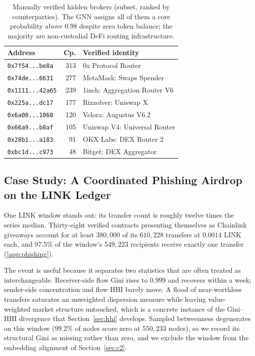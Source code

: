 \documentclass[final,5p,times]{elsarticle}
\begin{document}
\begin{table}[H]
\centering\small
\caption{Manually verified hidden brokers (subset, ranked by
counterparties). The GNN assigns all of them a core probability above
$0.98$ despite zero token balance; the majority are non-custodial DeFi
routing infrastructure.}
\label{tab:brokers}
\setlength{\tabcolsep}{4pt}
\begin{tabular}{@{}lrl@{}}
\toprule
Address & Cp. & Verified identity \\
\midrule
\texttt{0x7f54...be8a} & 313 & 0x Protocol Router \\
\texttt{0x74de...6631} & 277 & MetaMask: Swaps Spender \\
\texttt{0x1111...42a65} & 239 & 1inch: Aggregation Router V6 \\
\texttt{0x225a...dc17} & 177 & Rizzolver: Uniswap X \\
\texttt{0x6a00...1068} & 120 & Velora: Augustus V6.2 \\
\texttt{0x66a9...b8af} & 105 & Uniswap V4: Universal Router \\
\texttt{0x28b1...a183} & 91 & OKX Labs: DEX Router 2 \\
\texttt{0xbc1d...c973} & 48 & Bitget: DEX Aggregator \\
\bottomrule
\end{tabular}
\end{table}

\subsection{Case Study: A Coordinated Phishing Airdrop on the LINK Ledger}
\label{sec:w7}
One LINK window stands out: its transfer count is roughly twelve times the
series median. Thirty-eight verified contracts presenting themselves as
Chainlink giveaways account for at least $380{,}000$ of its $610{,}228$
transfers at $0.0014$ LINK each, and $97.5\%$ of the window's $549{,}223$
recipients receive exactly one transfer (\ref{app:phishing}).

The event is useful because it separates two statistics that are often
treated as interchangeable. Receiver-side flow Gini rises to $0.999$ and
recovers within a week; sender-side concentration and flow HHI barely move.
A flood of near-worthless transfers saturates an unweighted dispersion
measure while leaving value-weighted market structure untouched, which is a
concrete instance of the Gini--HHI divergence that Section~\ref{sec:hhi}
develops. Sampled betweenness degenerates on this window ($99.2\%$ of nodes
score zero at $550{,}233$ nodes), so we record its structural Gini as
missing rather than zero, and we exclude the window from the embedding
alignment of Section~\ref{sec:c2}.
\end{document}
